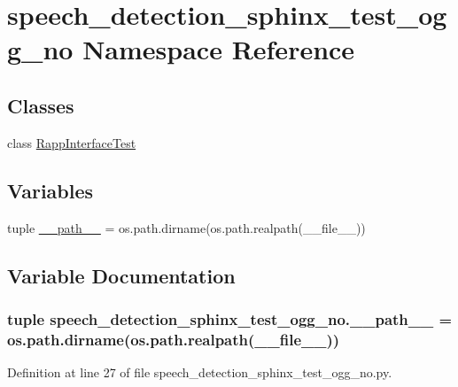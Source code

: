 \hypertarget{namespacespeech__detection__sphinx__test__ogg__no}{\section{speech\-\_\-detection\-\_\-sphinx\-\_\-test\-\_\-ogg\-\_\-no Namespace Reference}
\label{namespacespeech__detection__sphinx__test__ogg__no}
}
\subsection*{Classes}
\begin{DoxyCompactItemize}
\item 
class \hyperlink{classspeech__detection__sphinx__test__ogg__no_1_1RappInterfaceTest}{Rapp\-Interface\-Test}
\end{DoxyCompactItemize}
\subsection*{Variables}
\begin{DoxyCompactItemize}
\item 
tuple \hyperlink{namespacespeech__detection__sphinx__test__ogg__no_a03c2125f2ad09e437c52d0bda5255fa1}{\-\_\-\-\_\-path\-\_\-\-\_\-} = os.\-path.\-dirname(os.\-path.\-realpath(\-\_\-\-\_\-file\-\_\-\-\_\-))
\end{DoxyCompactItemize}


\subsection{Variable Documentation}
\hypertarget{namespacespeech__detection__sphinx__test__ogg__no_a03c2125f2ad09e437c52d0bda5255fa1}{
\subsubsection[{\-\_\-\-\_\-path\-\_\-\-\_\-}]{\setlength{\rightskip}{0pt plus 5cm}tuple speech\-\_\-detection\-\_\-sphinx\-\_\-test\-\_\-ogg\-\_\-no.\-\_\-\-\_\-path\-\_\-\-\_\- = os.\-path.\-dirname(os.\-path.\-realpath(\-\_\-\-\_\-file\-\_\-\-\_\-))}}\label{namespacespeech__detection__sphinx__test__ogg__no_a03c2125f2ad09e437c52d0bda5255fa1}


Definition at line 27 of file speech\-\_\-detection\-\_\-sphinx\-\_\-test\-\_\-ogg\-\_\-no.\-py.

